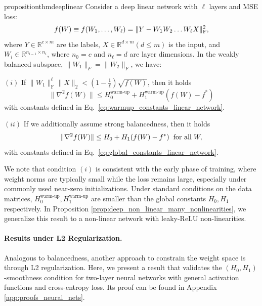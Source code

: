 \documentclass[a4paper,11pt]{article}
\newcommand{\1}{\mathbbm{1}}
\theoremstyle{plain}
\begin{document}
\begin{restatable}{proposition}{thmdeeplinear}
\label{prop:deep_linear}
   Consider a deep linear network with $\ell$ layers and MSE loss:
\[
    f(W) \equiv f(W_1,\dots, W_{\ell}) = \|Y- W_1 W_2 \dots W_{\ell} X\|_{\rm F}^2,
\]
where $Y \in \mathbb{R}^{c \times m}$ are the labels, $X \in \mathbb{R}^{d \times m} (d\leq m)$ is the input, and $W_i \in \mathbb{R}^{n_{i-1} \times n_i}$, where $n_0 = c$ and $n_{\ell} = d$ are layer dimensions. In the weakly balanced subspace, $\|W_1\|_F = \|W_2\|_F$, we have:

$(i)$ If $\|W_1\|_{\mathrm F}^\ell \|X\|_2 < (1-\frac{1}{\ell}) \sqrt{f(W)}$, then it holds
\begin{equation*}
\|\nabla^2 f(W)\| \leq H_0^{\text{warm-up}} + H_1^{\text{warm-up}} (f(W)-f^*)
\end{equation*}
with constants defined in Eq.~\eqref{eq:warmup_constants_linear_network}.

$(ii)$ If we additionally assume strong balancedness, then it holds
\begin{equation*}
\|\nabla^2 f(W)\| \leq H_0 + H_1 (f(W)-f^*) \hspace{2mm} \text{for all} \hspace{1mm} W,
\end{equation*}
with constants defined in Eq.~\eqref{eq:global_constants_linear_network}.



\end{restatable}

We note that condition $(i)$ is consistent with the early phase of training, where weight norms are typically small while the loss remains large, especially under commonly used near-zero initializations. Under standard conditions on the data matrices, $H_0^{\text{warm-up}}, H_1^{\text{warm-up}}$ are smaller than the global constants $H_0, H_1$ respectively. In Proposition \ref{prop:deep_non_linear_many_nonlinearities}, we generalize this result to a non-linear network with leaky-ReLU non-linearities.










\paragraph{Results under L2 Regularization.}
Analogous to balancedness, another approach to constrain the weight space is through L2 regularization. Here, we present a result that validates the $(H_0, H_1)$-smoothness condition for two-layer neural networks with general activation functions and cross-entropy loss. Its proof can be found in Appendix \ref{app:proofs_neural_nets}.
\end{document}

